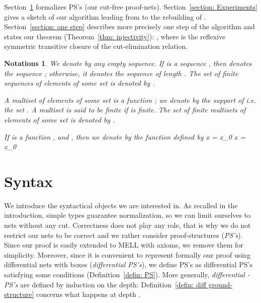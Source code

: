 \documentclass{article}
\theoremstyle{plain}
\newtheorem*{notations}{Notations}
\begin{document}
Section~\ref{section: Syntax} formalizes PS's (our cut-free proof-nets). Section~\ref{section: Experiments} gives a sketch of our algorithm leading from  to the rebuilding of . Section~\ref{section: one step} describes more precisely one step of the algorithm and states our theorem (Theorem~\ref{thm: injectivity}): 
, 
where  is the reflexive symmetric transitive closure of the cut-elimination relation.
 





\begin{notations} 
We denote by  any empty sequence. If  is a sequence , then  denotes the sequence ; otherwise, it denotes the sequence  of length . The set of finite sequences of elements of some set  is denoted by .

A multiset  of elements of some set  is a function ; we denote by  \emph{the support of } i.e. the set . A multiset  is said to be \emph{finite} if  is finite. The set of finite multisets of elements of some set  is denoted by .

If  is a function ,  and , then we denote by  the function  defined by x \not= x_0 x = x_0
\end{notations}

\section{Syntax}\label{section: Syntax}

We introduce the syntactical objects we are interested in. As recalled in the introduction, simple types guarantee normalization, so we can limit ourselves to nets without any cut. Correctness does not play any role, that is why we do not restrict our nets to be correct and we rather consider proof-structures (\emph{PS's}). Since our proof is easily extended to MELL with axioms, we remove them for simplicity. Moreover, since it is convenient to represent formally our proof using differential nets with boxes (\emph{differential PS's}), we define PS's as differential PS's satisfying some conditions (Definition~\ref{defin: PS}). More generally, \emph{differential -PS's} are defined by induction on the depth: Definition~\ref{defin: diff ground-structure} concerns what happens at depth .

\begin{comment}
Moreover, since it is convenient to present our algorithm 

Differential PS's are differential nets possibly with boxes that contain proof-structures (Definition~\ref{defin: differential PS}). They are defined by induction on the depth; Definition~\ref{defin: diff ground-structure} concerns what happens at depth . 
\end{comment}
\end{document}
